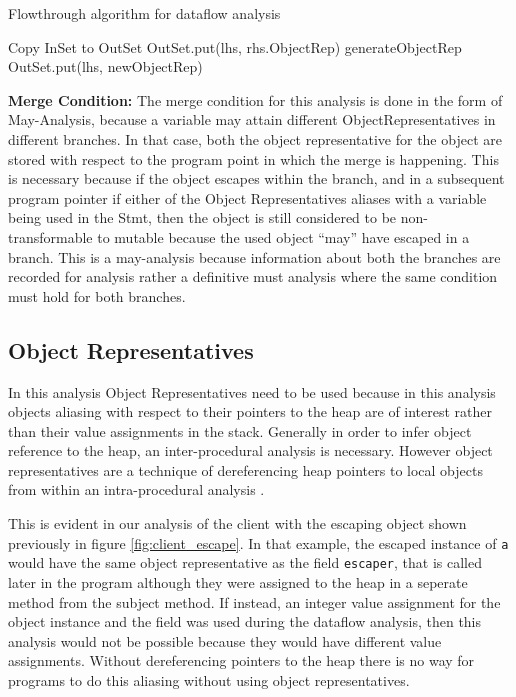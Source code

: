 \begin{algorithm}
\caption{Flowthrough algorithm for dataflow analysis}
\label{fig:flowthrough}
\begin{algorithmic}
  \State Copy InSet to OutSet\;
		\State OutSet.put(lhs, rhs.ObjectRep)\;
	\Else
		\State generateObjectRep\;
		\State OutSet.put(lhs, newObjectRep)\;
	\EndIf	

  \EndIf
\end{algorithmic}
\end{algorithm}
\textbf{Merge Condition: } The merge condition for this analysis is done in the form of May-Analysis, because a variable may attain different ObjectRepresentatives in different branches. In that case, both the object representative for the object are stored with respect to the program point in which the merge is happening. This is necessary because if the object escapes within the branch, and in a subsequent program pointer if either of the Object Representatives aliases with a variable being used in the Stmt, then the object is still considered to be non-transformable to mutable because the used object ``may'' have escaped in a branch. This is a may-analysis because information about both the branches are recorded for analysis rather a definitive must analysis where the same condition must hold for both branches.

\subsection{Object Representatives}\label{sec:OR}
In this analysis Object Representatives need to be used because in this analysis objects aliasing with respect to their pointers to the heap are of interest rather than their value assignments in the stack. Generally in order to infer object reference to the heap, an inter-procedural analysis is necessary. However object representatives are a technique of dereferencing heap pointers to local objects from within an intra-procedural analysis \cite{ref:or}.

This is evident in our analysis of the client with the escaping object shown previously in figure \ref{fig:client_escape}. In that example, the escaped instance of \texttt{a} would have the same object representative as the field \texttt{escaper}, that is called later in the program although they were assigned to the heap in a seperate method from the subject method. If instead, an integer value assignment for the object instance and the field was used during the dataflow analysis, then this analysis would not be possible because they would have different value assignments. Without dereferencing pointers to the heap there is no way for programs to do this aliasing without using object representatives.

